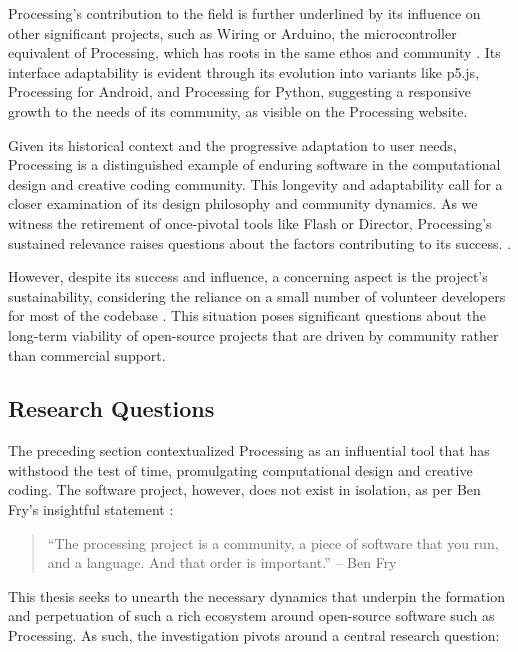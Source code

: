 Processing’s contribution to the field is further underlined by its influence on other significant projects, such as Wiring or Arduino, the microcontroller equivalent of Processing, which has roots in the same ethos and community \parencite{barraganUntoldHistoryArduino2016}. Its interface adaptability is evident through its evolution into variants like p5.js, Processing for Android, and Processing for Python, suggesting a responsive growth to the needs of its community, as visible on the Processing website. \parencite{processingfoundationProcessingWebsite}

Given its historical context and the progressive adaptation to user needs, Processing is a distinguished example of enduring software in the computational design and creative coding community. This longevity and adaptability call for a closer examination of its design philosophy and community dynamics. As we witness the retirement of once-pivotal tools like Flash or Director, Processing’s sustained relevance raises questions about the factors contributing to its success. \parencite{hortonDeathTechnicalSkill2020} \parencite{jobsThoughtsFlash2010} \parencite{adobecreativecloudteamFutureAdobeContribute2017}.

However, despite its success and influence, a concerning aspect is the project’s sustainability, considering the reliance on a small number of volunteer developers for most of the codebase \parencite{fryModernPrometheusHistory2018}. This situation poses significant questions about the long-term viability of open-source projects that are driven by community rather than commercial support.

\subsection{Research Questions}
The preceding section contextualized Processing as an influential tool that has withstood the test of time, promulgating computational design and creative coding. The software project, however, does not exist in isolation, as per Ben Fry’s insightful statement :

\begin{quote}
  \enquote{The processing project is a community, a piece of software that you run, and a language. And that order is important.} – Ben Fry \parencite[19:22]{artsatmit2017CASTSymposium2017}
\end{quote}\label{fry_quote}

This thesis seeks to unearth the necessary dynamics that underpin the formation and perpetuation of such a rich ecosystem around open-source software such as Processing. As such, the investigation pivots around a central research question:

